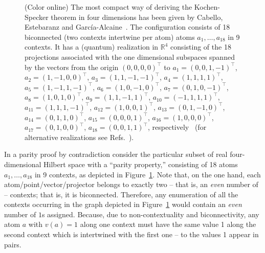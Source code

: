 \begin{figure}
\begin{center}
\begin{tikzpicture}  [scale=0.6]
	\end{tikzpicture}
\end{center}
\caption{(Color online)
The most compact way of deriving the Kochen-Specker theorem in four dimensions has been given by
Cabello, Estebaranz and Garc{\'{i}}a-Alcaine~\cite{cabello-96}.
The configuration consists of 18 biconnected (two contexts intertwine per atom)
atoms $a_1, \ldots , a_{18}$ in 9 contexts.
It has a (quantum) realization in $\mathbb{R}^4$
consisting of the 18 projections associated with the one dimensional subspaces spanned by
the vectors from the origin $(0,0,0,0)^\intercal$ to
$a_1=\left(   0,0,1,-1     \right)^\intercal    $,
$a_2=\left(   1,-1,0,0     \right)^\intercal    $,
$a_3=\left(   1,1,-1,-1    \right)^\intercal   $,
$a_4=\left(   1,1,1,1      \right)^\intercal     $,
$a_5=\left(   1,-1,1,-1    \right)^\intercal  $,
$a_6=\left(   1,0,-1,0     \right)^\intercal   $,
$a_7=\left(   0,1,0,-1   \right)^\intercal   $,
$a_8=\left(   1,0,1,0    \right)^\intercal    $,
$a_9=\left(   1,1,-1,1   \right)^\intercal   $,
$a_{10}=\left(-1,1,1,1   \right)^\intercal    $,
$a_{11}=\left(1,1,1,-1   \right)^\intercal    $,
$a_{12}=\left(1,0,0,1    \right)^\intercal     $,
$a_{13}=\left(0,1,-1,0   \right)^\intercal    $,
$a_{14}=\left(0,1,1,0    \right)^\intercal    $,
$a_{15}=\left(0,0,0,1    \right)^\intercal    $,
$a_{16}=\left(1,0,0,0    \right)^\intercal    $,
$a_{17}=\left(0,1,0,0    \right)^\intercal    $,
$a_{18}=\left(0,0,1,1    \right)^\intercal    $,
 respectively~\cite[Fig.~1]{cabello:210401}
(for alternative realizations see Refs.~\cite{cabello-99,cabello:210401}).
%
\label{2016-pu-book-chapter-qm-f-kspac}
}
\end{figure}

In a parity proof by contradiction
consider the particular subset of real four-dimensional Hilbert space with a ``parity property,''
consisting of 18 atoms $a_1, \ldots , a_{18}$ in 9 contexts,
as depicted in Figure~\ref{2016-pu-book-chapter-qm-f-kspac}.
Note that, on the one hand,
each atom/point/vector/projector belongs
to exactly two -- that is, an {\em even} number of -- contexts; that is, it is biconnected.
Therefore,
any enumeration of  all the contexts occurring in the graph
depicted in Figure~\ref{2016-pu-book-chapter-qm-f-kspac}
would contain an {\em even} number of $1$s assigned.
Because, due to non-contextuality and biconnectivity,
any atom $a$ with $v(a)=1$ along one context must have the same value 1 along the second context
which is intertwined with the first one -- to the values 1 appear in pairs.

